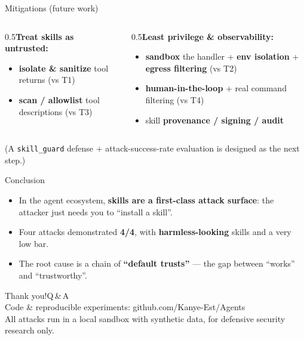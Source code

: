\documentclass[aspectratio=169,10pt,fontset=fandol]{ctexbeamer}
\begin{document}
\begin{frame}{Mitigations (future work)}
\begin{columns}
\begin{column}{0.5\textwidth}\textbf{Treat skills as untrusted:}
  \begin{itemize}[<+->]
    \item \textbf{isolate \& sanitize} tool returns (vs T1)
    \item \textbf{scan / allowlist} tool descriptions (vs T3)
  \end{itemize}\end{column}
\begin{column}{0.5\textwidth}\textbf{Least privilege \& observability:}
  \begin{itemize}[<+->]
    \item \textbf{sandbox} the handler + \textbf{env isolation} + \textbf{egress filtering} (vs T2)
    \item \textbf{human-in-the-loop} + real command filtering (vs T4)
    \item skill \textbf{provenance / signing / audit}
  \end{itemize}\end{column}
\end{columns}
\vfill\centering\footnotesize (A \texttt{skill\_guard} defense + attack-success-rate evaluation is designed as the next step.)
\end{frame}

\begin{frame}{Conclusion}
  \begin{itemize}[<+->]
    \item In the agent ecosystem, \textbf{skills are a first-class attack surface}: the attacker just needs you to ``install a skill''.
    \item Four attacks demonstrated \textbf{4/4}, with \textbf{harmless-looking} skills and a very low bar.
    \item The root cause is a chain of \textbf{``default trusts''} --- the gap between ``works'' and ``trustworthy''.
  \end{itemize}
  \vfill{}
\end{frame}

\begin{frame}[plain]
  \centering\vfill{\Huge Thank you!\quad Q\,\&\,A}\\[8pt]
  {\footnotesize Code \& reproducible experiments: github.com/Kanye-Est/Agents}\\
  {\scriptsize\color{gray} All attacks run in a local sandbox with synthetic data, for defensive security research only.}\vfill
\end{frame}
\end{document}
